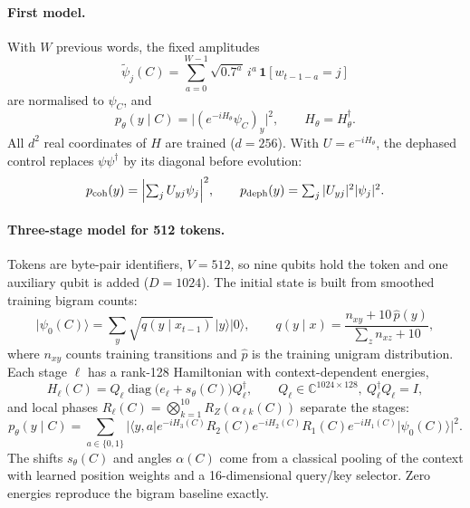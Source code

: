 \documentclass[11pt,a4paper]{article}
\providecommand{\ket}[1]{\lvert #1\rangle}
\providecommand{\bra}[1]{\langle #1\rvert}
\DeclareMathOperator{\diag}{diag}
\begin{document}
  \paragraph{First model.}
  With $W$ previous words, the fixed amplitudes
  \begin{equation*}
    \tilde\psi_j(C)=\textstyle\sum_{a=0}^{W-1}\sqrt{0.7^a}\,i^a\,\mathbf 1[w_{t-1-a}=j]
  \end{equation*}
  are normalised to $\psi_C$, and
  \begin{equation}
    p_\theta(y\mid C)=\bigl|(e^{-iH_\theta}\psi_C)_y\bigr|^2,\qquad H_\theta=H_\theta^\dagger .
  \end{equation}
  All $d^2$ real coordinates of $H$ are trained ($d=256$). With $U=e^{-iH_\theta}$, the dephased control replaces $\psi\psi^\dagger$ by its diagonal before evolution:
  \begin{equation}
    p_{\text{coh}}(y)=\Bigl|\textstyle\sum_j U_{yj}\psi_j\Bigr|^2,\qquad
    p_{\text{deph}}(y)=\textstyle\sum_j |U_{yj}|^2|\psi_j|^2 .
  \end{equation}

  \paragraph{Three-stage model for 512 tokens.}
  Tokens are byte-pair identifiers, $V=512$, so nine qubits hold the token and one auxiliary qubit is added ($D=1024$). The initial state is built from smoothed training bigram counts:
  \begin{equation}
    \ket{\psi_0(C)}=\sum_{y}\sqrt{q(y\mid x_{t-1})}\,\ket{y}\ket{0},\qquad
    q(y\mid x)=\frac{n_{xy}+10\,\hat p(y)}{\sum_z n_{xz}+10},
  \end{equation}
  where $n_{xy}$ counts training transitions and $\hat p$ is the training unigram distribution. Each stage $\ell$ has a rank-128 Hamiltonian with context-dependent energies,
  \begin{equation}
    H_\ell(C)=Q_\ell\diag\bigl(e_\ell+s_\theta(C)\bigr)Q_\ell^\dagger,\qquad Q_\ell\in\mathbb C^{1024\times128},\ Q_\ell^\dagger Q_\ell=I,
  \end{equation}
  and local phases $R_\ell(C)=\bigotimes_{k=1}^{10}R_Z(\alpha_{\ell k}(C))$ separate the stages:
  \begin{equation}
    p_\theta(y\mid C)=\sum_{a\in\{0,1\}}\bigl|\bra{y,a}e^{-iH_3(C)}R_2(C)e^{-iH_2(C)}R_1(C)e^{-iH_1(C)}\ket{\psi_0(C)}\bigr|^2 .
  \end{equation}
  The shifts $s_\theta(C)$ and angles $\alpha(C)$ come from a classical pooling of the context with learned position weights and a 16-dimensional query/key selector. Zero energies reproduce the bigram baseline exactly.
\end{document}
